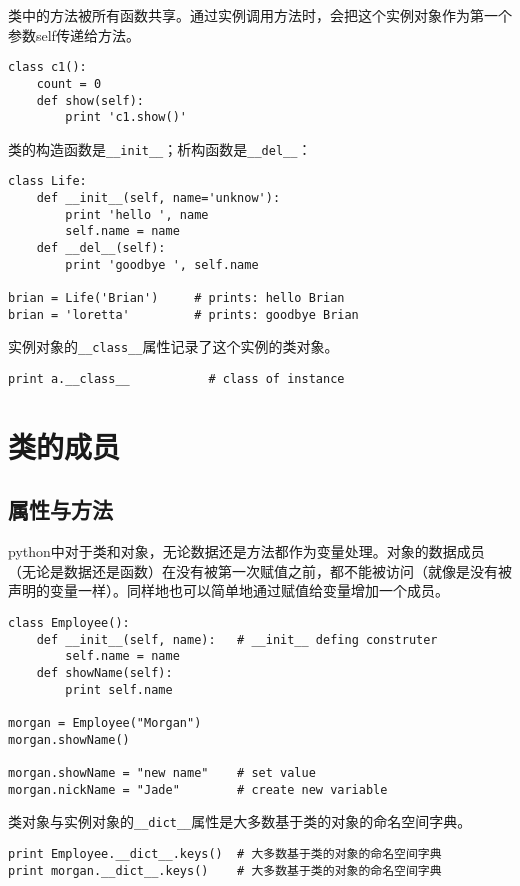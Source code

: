 类中的方法被所有函数共享。通过实例调用方法时，会把这个实例对象作为第一个参数self传递给方法。

\begin{lstlisting}
class c1():
	count = 0
	def show(self):
		print 'c1.show()'
\end{lstlisting}

类的构造函数是\verb|__init__|；析构函数是\verb|__del__|：

\begin{lstlisting}
class Life:
	def __init__(self, name='unknow'):
		print 'hello ', name
		self.name = name
	def __del__(self):
		print 'goodbye ', self.name

brian = Life('Brian')     # prints: hello Brian
brian = 'loretta'         # prints: goodbye Brian
\end{lstlisting}

		实例对象的\verb|__class__|属性记录了这个实例的类对象。

\begin{lstlisting}
print a.__class__           # class of instance
\end{lstlisting}

\section{类的成员}

\subsection{属性与方法}

python中对于类和对象，无论数据还是方法都作为变量处理。对象的数据成员（无论是数据还是函数）在没有被第一次赋值之前，都不能被访问（就像是没有被声明的变量一样）。同样地也可以简单地通过赋值给变量增加一个成员。

\begin{lstlisting}
class Employee():
	def __init__(self, name):   # __init__ defing construter
		self.name = name
	def showName(self):
		print self.name

morgan = Employee("Morgan")
morgan.showName()

morgan.showName = "new name"    # set value
morgan.nickName = "Jade"        # create new variable
\end{lstlisting}

类对象与实例对象的\verb|__dict__|属性是大多数基于类的对象的命名空间字典。

\begin{lstlisting}
print Employee.__dict__.keys()  # 大多数基于类的对象的命名空间字典
print morgan.__dict__.keys()    # 大多数基于类的对象的命名空间字典
\end{lstlisting}

